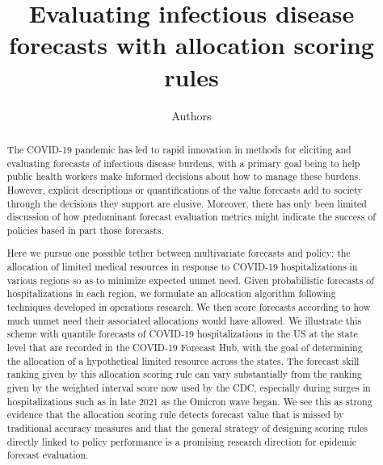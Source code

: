 \documentclass{article}
\title{Evaluating infectious disease forecasts with allocation scoring rules}
\author{Authors}
\begin{document}
\newcommand{\del}[2]{\frac{\partial {#1} }{\partial {#2}} }
\newcommand{\dby}[2]{\frac{d {#1} }{d {#2}} }
\newcommand{\sbar}{\overline{s}}
\newtheorem{proposition}{Proposition}

\theoremstyle{remark}
\newtheorem*{remark}{Remark}

\maketitle

\begin{abstract}

The COVID-19 pandemic has led to rapid innovation in methods for eliciting and evaluating forecasts of infectious disease burdens, with a primary goal being to help public health workers make informed decisions about how to manage these burdens. However, explicit descriptions or quantifications of the value forecasts add to society through the decisions they support are elusive.  Moreover, there has only been limited discussion of how predominant forecast evaluation metrics might indicate the success of policies based in part those forecasts.

Here we pursue one possible tether between multivariate forecasts and policy: the allocation of limited medical resources in response to COVID-19 hospitalizations in various regions so as to minimize expected unmet need. Given probabilistic forecasts of hospitalizations in each region, we formulate an allocation algorithm following techniques developed in operations research. We then score forecasts according to how much unmet need their associated allocations would have allowed. We illustrate this scheme with quantile forecasts of COVID-19 hospitalizations in the US at the state level that are recorded in the COVID-19 Forecast Hub, with the goal of determining the allocation of a hypothetical limited resource across the states. The forecast skill ranking given by this allocation scoring rule can vary substantially from the ranking given by the weighted interval score now used by the CDC, especially during surges in hospitalizations such as in late 2021 as the Omicron wave began. We see this as strong evidence that the allocation scoring rule detects forecast value that is missed by traditional accuracy measures and that the general strategy of designing scoring rules directly linked to policy performance is a promising research direction for epidemic forecast evaluation.

\end{abstract}
\end{document}
